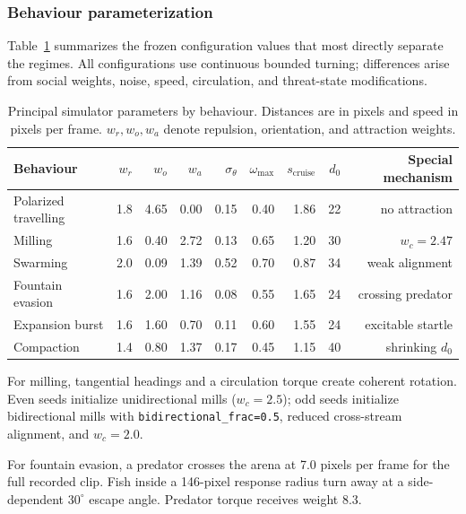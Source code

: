 \documentclass[11pt]{article}
\begin{document}
\subsubsection{Behaviour parameterization}

Table~\ref{tab:behaviour-configs} summarizes the frozen configuration values that most directly separate
the regimes. All configurations use continuous bounded turning; differences arise from social weights,
noise, speed, circulation, and threat-state modifications.

\begin{table}[t]
\centering
\caption{Principal simulator parameters by behaviour. Distances are in pixels and speed in pixels per
frame. \(w_r,w_o,w_a\) denote repulsion, orientation, and attraction weights.}
\label{tab:behaviour-configs}
\small
\begin{tabular}{lrrrrrrrr}
\toprule
Behaviour & \(w_r\) & \(w_o\) & \(w_a\) & \(\sigma_\theta\) &
\(\omega_{\max}\) & \(s_{\mathrm{cruise}}\) & \(d_0\) & Special mechanism\\
\midrule
Polarized travelling & 1.8 & 4.65 & 0.00 & 0.15 & 0.40 & 1.86 & 22 & no attraction\\
Milling              & 1.6 & 0.40 & 2.72 & 0.13 & 0.65 & 1.20 & 30 & \(w_c=2.47\)\\
Swarming             & 2.0 & 0.09 & 1.39 & 0.52 & 0.70 & 0.87 & 34 & weak alignment\\
Fountain evasion     & 1.6 & 2.00 & 1.16 & 0.08 & 0.55 & 1.65 & 24 & crossing predator\\
Expansion burst      & 1.6 & 1.60 & 0.70 & 0.11 & 0.60 & 1.55 & 24 & excitable startle\\
Compaction           & 1.4 & 0.80 & 1.37 & 0.17 & 0.45 & 1.15 & 40 & shrinking \(d_0\)\\
\bottomrule
\end{tabular}
\end{table}

For milling, tangential headings and a circulation torque create coherent rotation. Even seeds initialize
unidirectional mills (\(w_c=2.5\)); odd seeds initialize bidirectional mills with
\texttt{bidirectional\_frac=0.5}, reduced cross-stream alignment, and \(w_c=2.0\).

For fountain evasion, a predator crosses the arena at 7.0 pixels per frame for the full recorded clip.
Fish inside a 146-pixel response radius turn away at a side-dependent \(30^\circ\) escape angle.
Predator torque receives weight 8.3.
\end{document}
